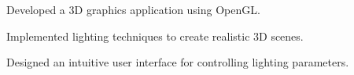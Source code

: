 \begin{minipage}[t]{0.63\textwidth}
    \vspace{5pt}
    \begin{tightemize}
      \item Developed a 3D graphics application using OpenGL.
      \item Implemented lighting techniques to create realistic 3D scenes.
      \item Designed an intuitive user interface for controlling lighting parameters.
    \end{tightemize}
  \sectionsep




  \end{minipage}
